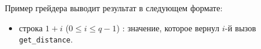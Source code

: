 Пример грейдера выводит результат в следующем формате:
\begin{itemize}
\item строка $1 + i$ ($0 \leq i \leq q - 1$) : значение, которое вернул $i$-й вызов \texttt{get\_distance}.
\end{itemize}
